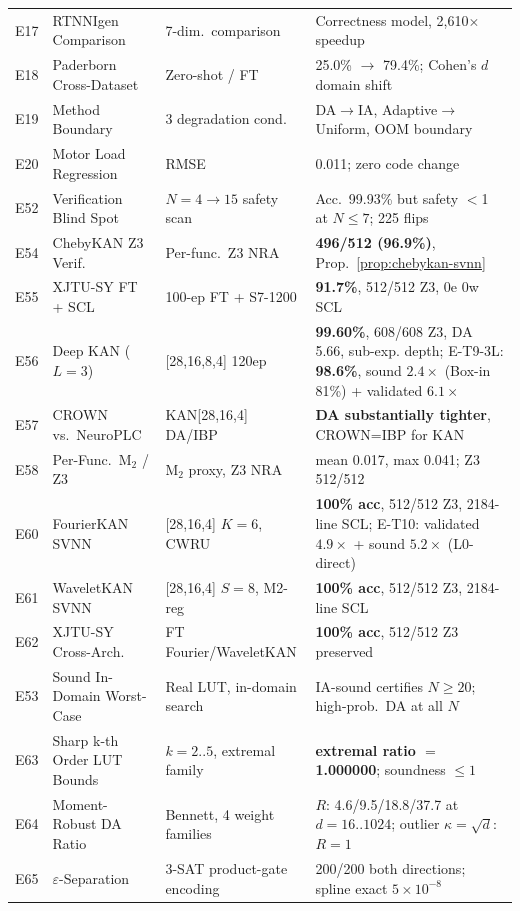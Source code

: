\documentclass[journal,onecolumn]{IEEEtran}
\begin{document}
\begin{table}[tb]
\begin{tabular}{@{}p{0.7cm}p{4.6cm}p{3.6cm}p{4.9cm}@{}}
E17& RTNNIgen Comparison   & 7-dim.\ comparison  & Correctness model, 2,610$\times$ speedup \\
E18& Paderborn Cross-Dataset& Zero-shot / FT     & 25.0\% $\to$ 79.4\%; Cohen's $d$ domain shift \\
E19& Method Boundary        & 3 degradation cond. & DA$\to$IA, Adaptive$\to$Uniform, OOM boundary \\
E20& Motor Load Regression   & RMSE                & 0.011; zero code change \\
E52& Verification Blind Spot & $N{=}4{\to}15$ safety scan & Acc.\ 99.93\% but safety $<$1 at $N{\le}7$; 225 flips \\
E54& ChebyKAN Z3 Verif.     & Per-func.\ Z3 NRA   & \textbf{496/512 (96.9\%)}, Prop.~\ref{prop:chebykan-svnn} \\
E55& XJTU-SY FT + SCL       & 100-ep FT + S7-1200 & \textbf{91.7\%}, 512/512 Z3, 0e 0w SCL \\
E56& Deep KAN ($L{=}3$)       & [28,16,8,4] 120ep & \textbf{99.60\%}, 608/608 Z3, DA 5.66, sub-exp. depth; E-T9-3L: \textbf{98.6\%}, sound $2.4\times$ (Box-in 81\%) + validated $6.1\times$ \\
E57& CROWN vs.\ NeuroPLC     & KAN[28,16,4] DA/IBP & \textbf{DA substantially tighter}, CROWN=IBP for KAN \\
E58& Per-Func.\ M$_2$ / Z3    & M$_2$ proxy, Z3 NRA & mean 0.017, max 0.041; Z3 512/512 \\
E60& FourierKAN SVNN           & [28,16,4] $K{=}6$, CWRU & \textbf{100\% acc}, 512/512 Z3, 2184-line SCL; E-T10: validated $4.9\times$ + sound $5.2\times$ (L0-direct) \\
E61& WaveletKAN SVNN           & [28,16,4] $S{=}8$, M2-reg & \textbf{100\% acc}, 512/512 Z3, 2184-line SCL \\
E62& XJTU-SY Cross-Arch.       & FT Fourier/WaveletKAN & \textbf{100\% acc}, 512/512 Z3 preserved \\
E53& Sound In-Domain Worst-Case & Real LUT, in-domain search & IA-sound certifies $N{\ge}20$; high-prob.\ DA at all $N$ \\
E63& Sharp k-th Order LUT Bounds & $k{=}2..5$, extremal family & \textbf{extremal ratio $=$ 1.000000}; soundness $\leq 1$ \\
E64& Moment-Robust DA Ratio    & Bennett, 4 weight families & $R$: 4.6/9.5/18.8/37.7 at $d{=}16..1024$; outlier $\kappa{=}\sqrt{d}$: $R{=}1$ \\
E65& $\varepsilon$-Separation   & 3-SAT product-gate encoding & 200/200 both directions; spline exact $5{\times}10^{-8}$ \\

\end{tabular}
\end{table}
\end{document}
